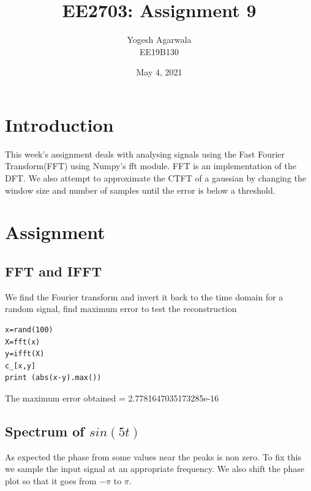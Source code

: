 \documentclass{article}
\title{EE2703: Assignment 9}
\author{Yogesh Agarwala \\ EE19B130}
\date{May 4, 2021}
\begin{document}
\maketitle

\section{Introduction}
This week's assignment deals with analysing signals using the Fast Fourier Transform(FFT) using Numpy's fft module. FFT is an implementation of the DFT. We also attempt to approximate the CTFT of a gaussian by changing the window size and number of samples until the error is below a threshold.



\section {Assignment}
\subsection {FFT and IFFT}
We find the Fourier transform and invert it back to the time domain for a random signal, find maximum error to test the reconstruction

\begin{lstlisting}
x=rand(100)
X=fft(x)
y=ifft(X)
c_[x,y]
print (abs(x-y).max())
\end{lstlisting}
The maximum error obtained = 2.7781647035173285e-16



\subsection{Spectrum of $sin(5t)$}
As expected the phase from some values near the peaks is non zero. To fix this we sample the input signal at an appropriate frequency. We also shift the phase plot so that it goes from $-\pi$ to $\pi$.
\end{document}
